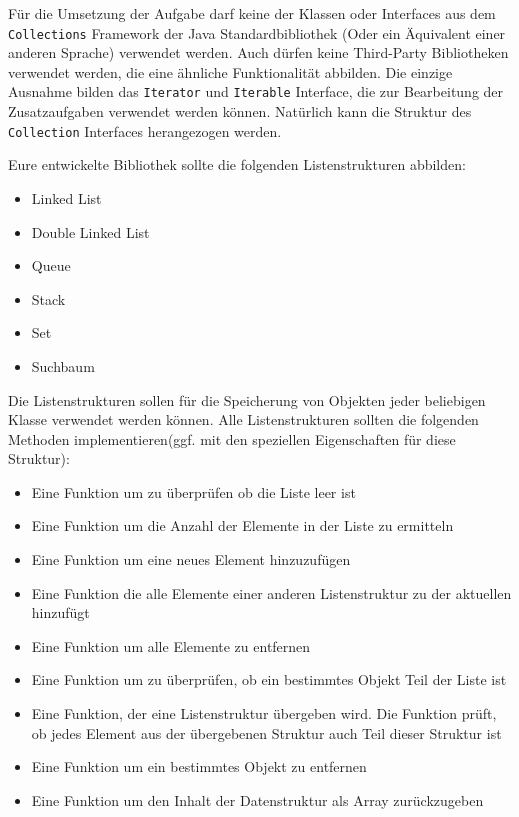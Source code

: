 \documentclass[a4paper,
			   fontsize=12pt]{article}
\begin{document}
Für die Umsetzung der Aufgabe darf keine der Klassen oder Interfaces aus dem \texttt{Collections} Framework der Java Standardbibliothek (Oder ein Äquivalent einer anderen Sprache) verwendet werden. Auch dürfen keine Third-Party Bibliotheken
verwendet werden, die eine ähnliche Funktionalität abbilden. Die einzige Ausnahme bilden das \texttt{Iterator} und \texttt{Iterable} Interface, die zur Bearbeitung der Zusatzaufgaben verwendet werden können. Natürlich kann die Struktur des
\texttt{Collection} Interfaces herangezogen werden.

Eure entwickelte Bibliothek sollte die folgenden Listenstrukturen abbilden:
\begin{itemize}
	\item Linked List
	\item Double Linked List
	\item Queue
	\item Stack
	\item Set
	\item Suchbaum
\end{itemize}

Die Listenstrukturen sollen für die Speicherung von Objekten jeder beliebigen Klasse verwendet werden können. Alle Listenstrukturen sollten die folgenden Methoden
implementieren(ggf. mit den speziellen Eigenschaften für diese Struktur):
\begin{itemize}
	\item Eine Funktion um zu überprüfen ob die Liste leer ist
	\item Eine Funktion um die Anzahl der Elemente in der Liste zu ermitteln
	\item Eine Funktion um eine neues Element hinzuzufügen
	\item Eine Funktion die alle Elemente einer anderen Listenstruktur zu der aktuellen hinzufügt
	\item Eine Funktion um alle Elemente zu entfernen
	\item Eine Funktion um zu überprüfen, ob ein bestimmtes Objekt Teil der Liste ist
	\item Eine Funktion, der eine Listenstruktur übergeben wird. Die Funktion prüft, ob jedes Element aus der übergebenen Struktur auch Teil dieser Struktur ist
	\item Eine Funktion um ein bestimmtes Objekt zu entfernen
	\item Eine Funktion um den Inhalt der Datenstruktur als Array zurückzugeben
\end{itemize}
\end{document}

